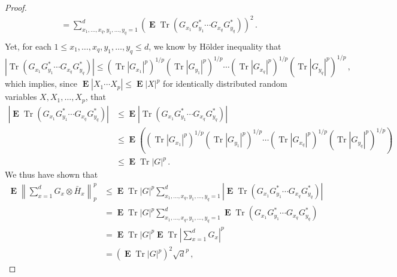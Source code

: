 \documentclass{amsart}
\renewcommand{\leq}{\leqslant}
\DeclareMathOperator{\Tr}{Tr}
\DeclareMathOperator{\E}{\mathbf{E}}
\begin{document}
\begin{proof}
\begin{align*}
                                                                     & = \sum_{x_1,\ldots,x_q,y_1,\ldots,y_q=1}^d \left( \E \Tr\left(G_{x_1}G^*_{y_1}\cdots G_{x_q}G^*_{y_q}\right) \right)^2 \, .                                                                           \\
    \end{align*}
    Yet, for each $1\leq x_1,\ldots,x_q,y_1,\ldots,y_q\leq d$, we know by H\"{o}lder inequality that
    \[ \left| \Tr\left(G_{x_1}G^*_{y_1}\cdots G_{x_q}G^*_{y_q}\right) \right| \leq \left(\Tr\left|G_{x_1}\right|^p\right)^{1/p}\left(\Tr\left|G_{y_1}\right|^p\right)^{1/p} \cdots \left(\Tr\left|G_{x_q}\right|^p\right)^{1/p}\left(\Tr\left|G_{y_q}\right|^p\right)^{1/p} \, , \]
    which implies, since $\E|X_1\cdots X_p| \leq \E|X|^p$ for identically distributed random variables $X,X_1,\ldots,X_p$, that
    \begin{align*}
        \left| \E \Tr\left(G_{x_1}G^*_{y_1}\cdots G_{x_q}G^*_{y_q}\right) \right| & \leq \E \left| \Tr\left(G_{x_1}G^*_{y_1}\cdots G_{x_q}G^*_{y_q}\right) \right|                                                                                                                                  \\
                                                                                  & \leq \E \left( \left(\Tr\left|G_{x_1}\right|^p\right)^{1/p}\left(\Tr\left|G_{y_1}\right|^p\right)^{1/p} \cdots \left(\Tr\left|G_{x_q}\right|^p\right)^{1/p}\left(\Tr\left|G_{y_q}\right|^p\right)^{1/p} \right) \\
                                                                                  & \leq \E \Tr|G|^p \, .
    \end{align*}
    We thus have shown that
    \begin{align*}
        \E \left\| \sum_{x=1}^d G_{x}\otimes\bar{H}_{x} \right\|^p_p & \leq \E \Tr|G|^p \sum_{x_1,\ldots,x_q,y_1,\ldots,y_q=1}^d \left| \E \Tr\left(G_{x_1}G^*_{y_1}\cdots G_{x_q}G^*_{y_q}\right) \right| \\
                                                                     & = \E \Tr|G|^p \sum_{x_1,\ldots,x_q,y_1,\ldots,y_q=1}^d \E \Tr\left(G_{x_1}G^*_{y_1}\cdots G_{x_q}G^*_{y_q}\right)                   \\
                                                                     & = \E \Tr|G|^p \E \Tr\left| \sum_{x=1}^d G_x \right|^p                                                                               \\
                                                                     & = (\E \Tr|G|^p)^2\sqrt{d}^p \, ,

\end{align*}
\end{proof}
\end{document}
